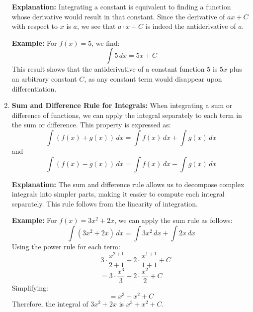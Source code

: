 \begin{enumerate}
    \textbf{Explanation:} Integrating a constant is equivalent to finding a function whose derivative would result in that constant. Since the derivative of \( ax + C \) with respect to \( x \) is \( a \), we see that \( a \cdot x + C \) is indeed the antiderivative of \( a \).

    \textbf{Example:} For \( f(x) = 5 \), we find:
    \[
    \int 5 \, dx = 5x + C
    \]
    This result shows that the antiderivative of a constant function \( 5 \) is \( 5x \) plus an arbitrary constant \( C \), as any constant term would disappear upon differentiation.

    \begin{center}
    \end{center}

    \item \textbf{Sum and Difference Rule for Integrals:} When integrating a sum or difference of functions, we can apply the integral separately to each term in the sum or difference. This property is expressed as:
    \[
    \int \left( f(x) + g(x) \right) \, dx = \int f(x) \, dx + \int g(x) \, dx
    \]
    and
    \[
    \int \left( f(x) - g(x) \right) \, dx = \int f(x) \, dx - \int g(x) \, dx
    \]

    \textbf{Explanation:} The sum and difference rule allows us to decompose complex integrals into simpler parts, making it easier to compute each integral separately. This rule follows from the linearity of integration.

    \textbf{Example:} For \( f(x) = 3x^2 + 2x \), we can apply the sum rule as follows:
    \[
    \int (3x^2 + 2x) \, dx = \int 3x^2 \, dx + \int 2x \, dx
    \]
    Using the power rule for each term:
    \[
    = 3 \cdot \frac{x^{2+1}}{2+1} + 2 \cdot \frac{x^{1+1}}{1+1} + C
    \]
    \[
    = 3 \cdot \frac{x^3}{3} + 2 \cdot \frac{x^2}{2} + C
    \]
    Simplifying:
    \[
    = x^3 + x^2 + C
    \]
    Therefore, the integral of \( 3x^2 + 2x \) is \( x^3 + x^2 + C \).


\end{enumerate}
